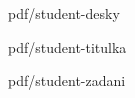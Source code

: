 \documentclass[%
  12pt,       				%
  a4paper,    				%
	unicode,						%
]{report}				    	%
\begin{document}
\pagestyle{empty} %

%
  {pdf/student-desky}%
\setcounter{page}{1} %

%
  {pdf/student-titulka}%
   
%
  {pdf/student-zadani}%

\vytvorabstrakt
\end{document}
